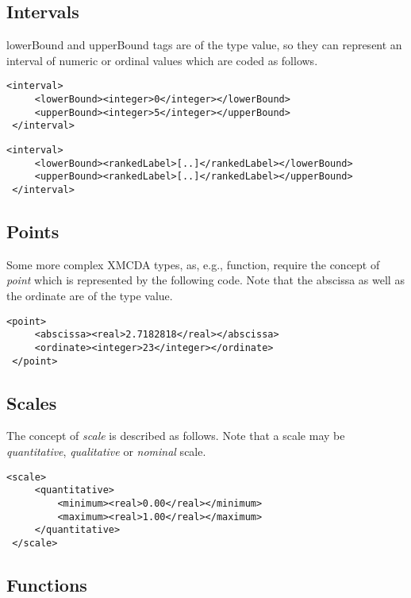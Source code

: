 \documentclass[a4paper,oneside,10 pt]{article}
\newcommand{\XMCDA}{{\asciifamily XMCDA}\xspace}
\newcommand{\code}{\asciifamily}
\begin{document}
\subsection{Intervals}

{\code lowerBound} and {\code upperBound} tags are of the type {\code value}, so they can represent an interval of numeric or ordinal values which are coded as follows.
{\code
\begin{lstlisting}[style=prototype]
 <interval>
	 <lowerBound><integer>0</integer></lowerBound>
	 <upperBound><integer>5</integer></upperBound>
 </interval>
\end{lstlisting}

\begin{lstlisting}[style=prototype]
 <interval>
	 <lowerBound><rankedLabel>[..]</rankedLabel></lowerBound>
	 <upperBound><rankedLabel>[..]</rankedLabel></upperBound>
 </interval>
\end{lstlisting} 
}
\subsection{Points}

Some more complex \XMCDA types, as, e.g., {\code function}, require the concept of \textit{point} which is represented by the following code. Note that the abscissa as well as the ordinate are of the type {\code value}. 
{\code
\begin{lstlisting}[style=prototype]
 <point>
	 <abscissa><real>2.7182818</real></abscissa>
	 <ordinate><integer>23</integer></ordinate>
 </point>
\end{lstlisting}
}

\subsection{Scales}

The concept of {\em scale} is described as follows. Note that a scale may be {\em quantitative}, {\em qualitative} or {\em nominal} scale.
{\code
\begin{lstlisting}[style=prototype]
 <scale>
	 <quantitative>
		 <minimum><real>0.00</real></minimum>
		 <maximum><real>1.00</real></maximum>
	 </quantitative>
 </scale>
\end{lstlisting}
}

\subsection{Functions}
\end{document}
